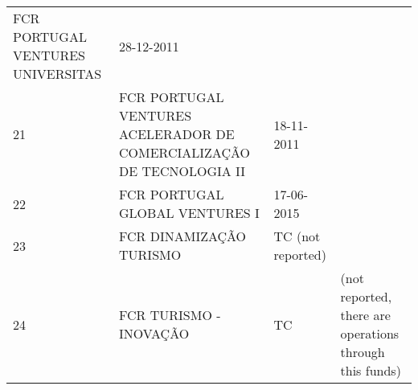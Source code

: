 \documentclass[]{book}
\theoremstyle{definition}
\theoremstyle{definition}
\theoremstyle{definition}
\theoremstyle{remark}
\begin{document}
\begin{longtable}[]{@{}llll@{}}
\begin{minipage}[t]{0.17\columnwidth}
FCR PORTUGAL VENTURES UNIVERSITAS\strut
\end{minipage} & \begin{minipage}[t]{0.17\columnwidth}\raggedright\strut
28-12-2011\strut
\end{minipage}\tabularnewline
\begin{minipage}[t]{0.17\columnwidth}\raggedright\strut
21\strut
\end{minipage} & \begin{minipage}[t]{0.17\columnwidth}\raggedright\strut
FCR PORTUGAL VENTURES ACELERADOR DE COMERCIALIZAÇÃO DE TECNOLOGIA
II\strut
\end{minipage} & \begin{minipage}[t]{0.17\columnwidth}\raggedright\strut
18-11-2011\strut
\end{minipage}\tabularnewline
\begin{minipage}[t]{0.17\columnwidth}\raggedright\strut
22\strut
\end{minipage} & \begin{minipage}[t]{0.17\columnwidth}\raggedright\strut
FCR PORTUGAL GLOBAL VENTURES I\strut
\end{minipage} & \begin{minipage}[t]{0.17\columnwidth}\raggedright\strut
17-06-2015\strut
\end{minipage}\tabularnewline
\begin{minipage}[t]{0.17\columnwidth}\raggedright\strut
23\strut
\end{minipage} & \begin{minipage}[t]{0.17\columnwidth}\raggedright\strut
FCR DINAMIZAÇÃO TURISMO\strut
\end{minipage} & \begin{minipage}[t]{0.17\columnwidth}\raggedright\strut
TC (not reported)\strut
\end{minipage}\tabularnewline
\begin{minipage}[t]{0.17\columnwidth}\raggedright\strut
24\strut
\end{minipage} & \begin{minipage}[t]{0.17\columnwidth}\raggedright\strut
FCR TURISMO - INOVAÇÃO\strut
\end{minipage} & \begin{minipage}[t]{0.17\columnwidth}\raggedright\strut
TC\strut
\end{minipage} & \begin{minipage}[t]{0.17\columnwidth}\raggedright\strut
(not reported, there are operations through this funds)\strut
\end{minipage}\tabularnewline

\end{longtable}
\end{document}
